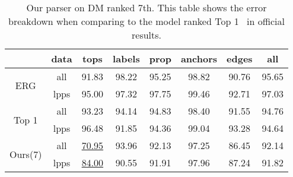 \begin{table}[!tbp]
\caption{\label{tbl:results_dm} Our parser on DM ranked 7th. This table shows the error breakdown when comparing to the model ranked Top 1~\citep{Li:Zha:Zha:19} in official results.}
\begin{center}
\setlength{\tabcolsep}{3pt}
\begin{tabular}{cccccccc}
  \toprule
 \hline
                            & data & tops              & labels & prop  & anchors & edges & all   \\ \hline
  \multirow{2}{*}{ ERG }    & all  & 91.83             & 98.22  & 95.25 & 98.82   & 90.76 & 95.65 \\
                            & lpps & 95.00             & 97.32  & 97.75 & 99.46   & 92.71 & 97.03 \\
  \multirow{2}{*}{Top 1}    & all  & 93.23             & 94.14  & 94.83 & 98.40   & 91.55 & 94.76 \\
                            & lpps & 96.48             & 91.85  & 94.36 & 99.04   & 93.28 & 94.64 \\
  \multirow{2}{*}{ Ours(7)} & all  & \underline{70.95} & 93.96  & 92.13 & 97.25   & 86.45 & 92.14 \\
                            & lpps & \underline{84.00} & 90.55  & 91.91 & 97.96   & 87.24 & 91.82 \\ \hline
\bottomrule
\end{tabular}
\end{center}
\end{table}



